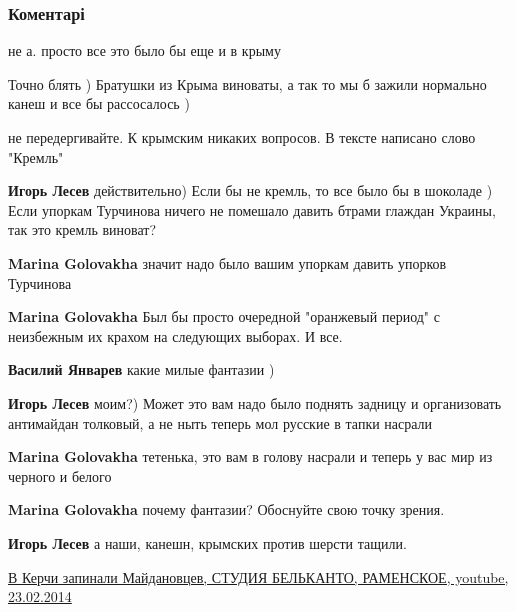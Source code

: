  
 
 
 
 
\subsubsection{Коментарі}
\label{sec:03_07_2020.fb.lesev_igor.1.ulichnye_bandy.cmt}

\begin{itemize} %
не а. просто все это было бы еще и в крыму

Точно блять ) Братушки из Крыма виноваты, а так то мы б зажили нормально канеш и все бы рассосалось )

\begin{itemize} %
не передергивайте. К крымским никаких вопросов. В тексте написано слово "Кремль"

\textbf{Игорь Лесев} действительно) Если бы не кремль, то все было бы в шоколаде ) Если упоркам Турчинова ничего не помешало давить бтрами глаждан Украины, так это кремль виноват?

\textbf{Marina Golovakha} значит надо было вашим упоркам давить упорков Турчинова

\textbf{Marina Golovakha} Был бы просто очередной "оранжевый период" с неизбежным их крахом на следующих выборах. И все.

\textbf{Василий Январев} какие милые фантазии )

\textbf{Игорь Лесев} моим?) Может это вам надо было поднять задницу и организовать антимайдан толковый, а не ныть теперь мол русские в тапки насрали

\textbf{Marina Golovakha} тетенька, это вам в голову насрали и теперь у вас мир из черного и белого

\textbf{Marina Golovakha} почему фантазии? Обоснуйте свою точку зрения.

\textbf{Игорь Лесев} а наши, канешн, крымских против шерсти тащили. 

\href{https://youtu.be/wQTUceLw5YU}{%
В Керчи запинали Майдановцев, СТУДИЯ БЕЛЬКАНТО, РАМЕНСКОЕ, youtube, 23.02.2014%
}


\end{itemize}
\end{itemize}
